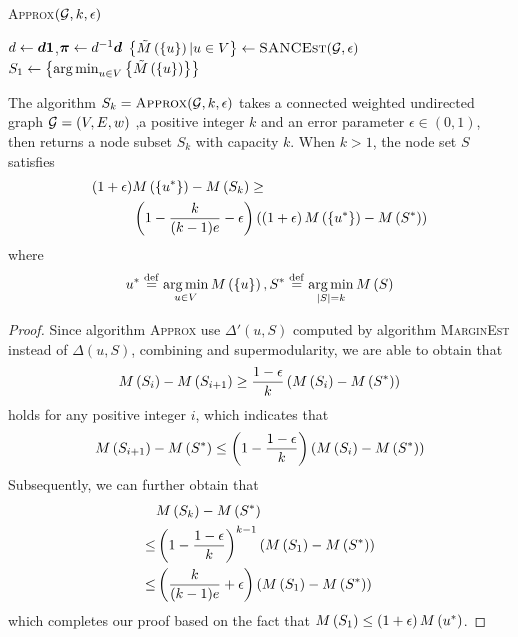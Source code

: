 \documentclass[sigconf]{acmart}
\begin{document}
\begin{algorithm}
    \caption{\textsc{Approx}\((\mathcal{G},k,\epsilon)\)}
    \label{algo:approx}
    \(d\gets\boldsymbol{d}\boldsymbol{1}\),\(\boldsymbol{\pi}\gets d^{-1}\boldsymbol{d}\)\;
    \(\left\{\tilde{M}\left(\left\{u \right\}\right)|u\in V  \right\}\gets\textsc{SANCEst}(\mathcal{G},\epsilon)\)\;
    \(S_1\gets\left\{\operatorname*{arg\,min}_{u\in V}\left\{\tilde{M}\left(\left\{u \right\}\right) \right\} \right\}\)\;
\end{algorithm}

\begin{theorem}
    The algorithm \(S_k=\textsc{Approx}(\mathcal{G},k,\epsilon)\) takes a connected weighted undirected graph \(\mathcal{G}=(V,E,w)\) ,a positive integer \(k\) and an error parameter \(\epsilon\in(0,1)\), then returns a node subset \(S_k\) with capacity \(k\). When \(k>1\), the node set \(S\) satisfies
    \begin{align*}
        \left( 1+\epsilon \right) & M\left(\left\{u^* \right\}\right)-M\left(S_k\right)\ge                                                           \\
                           & \left( 1-\frac{k}{(k-1)e}-\epsilon \right)\left( \left( 1+\epsilon \right)M\left(\left\{u^* \right\}\right)-M\left(S^*\right) \right)
    \end{align*}
    where
    \[u^*\stackrel{\mathrm{def}}{=}\operatorname*{arg\,min}_{u\in V}M\left(\left\{u \right\}\right),S^*\stackrel{\mathrm{def}}{=}\operatorname*{arg\,min}_{\left|S \right|=k}M\left(S\right)\]
\end{theorem}
\begin{proof}
    Since algorithm \textsc{Approx} use \(\Delta'(u,S)\) computed by algorithm \textsc{MarginEst} instead of \(\Delta(u,S)\), combining  and supermodularity, we are able to obtain that
    \[M\left(S_i\right)-M\left(S_{i+1}\right)\ge\frac{1-\epsilon}{k}\left( M\left(S_i\right)-M\left(S^*\right) \right)\]
    holds for any positive integer \(i\), which indicates that
    \[M\left(S_{i+1}\right)-M\left(S^*\right)\le\left( 1-\frac{1-\epsilon}{k} \right)\left( M\left(S_i\right)-M\left(S^*\right) \right)\]
    Subsequently, we can further obtain that
    \begin{align*}
            & M\left(S_k\right)-M\left(S^*\right)                                             \\
        \le & \left( 1-\frac{1-\epsilon}{k} \right)^{k-1}\left( M\left(S_1\right)-M\left(S^*\right) \right) \\
        \le & \left( \frac{k}{(k-1)e}+\epsilon \right)\left( M\left(S_1\right)-M\left(S^*\right) \right)
    \end{align*}
    which completes our proof based on the fact that \(M\left(S_1\right)\le\left( 1+\epsilon \right)M\left(u^*\right)\).
\end{proof}
\end{document}
